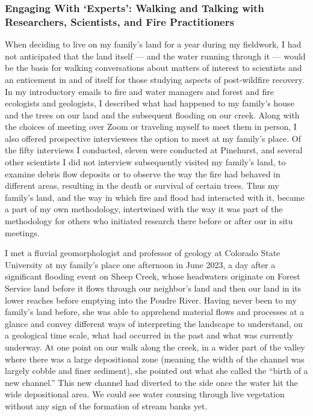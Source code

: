 \documentclass[
]{article}
\begin{document}
\subsubsection{Engaging With `Experts': Walking and Talking with Researchers, Scientists, and Fire Practitioners}\label{engaging-with-experts-walking-and-talking-with-researchers-scientists-and-fire-practitioners}

When deciding to live on my family's land for a year during my fieldwork, I had not anticipated that the land itself --- and the water running through it --- would be the basis for walking conversations about matters of interest to scientists and an enticement in and of itself for those studying aspects of post-wildfire recovery. In my introductory emails to fire and water managers and forest and fire ecologists and geologists, I described what had happened to my family's house and the trees on our land and the subsequent flooding on our creek. Along with the choices of meeting over Zoom or traveling myself to meet them in person, I also offered prospective interviewees the option to meet at my family's place. Of the fifty interviews I conducted, eleven were conducted at Pinehurst, and several other scientists I did not interview subsequently visited my family's land, to examine debris flow deposits or to observe the way the fire had behaved in different areas, resulting in the death or survival of certain trees. Thus my family's land, and the way in which fire and flood had interacted with it, became a part of my own methodology, intertwined with the way it was part of the methodology for others who initiated research there before or after our in situ meetings.

I met a fluvial geomorphologist and professor of geology at Colorado State University at my family's place one afternoon in June 2023, a day after a significant flooding event on Sheep Creek, whose headwaters originate on Forest Service land before it flows through our neighbor's land and then our land in its lower reaches before emptying into the Poudre River. Having never been to my family's land before, she was able to apprehend material flows and processes at a glance and convey different ways of interpreting the landscape to understand, on a geological time scale, what had occurred in the past and what was currently underway. At one point on our walk along the creek, in a wider part of the valley where there was a large depositional zone (meaning the width of the channel was largely cobble and finer sediment), she pointed out what she called the ``birth of a new channel.'' This new channel had diverted to the side once the water hit the wide depositional area. We could see water coursing through live vegetation without any sign of the formation of stream banks yet.
\end{document}
